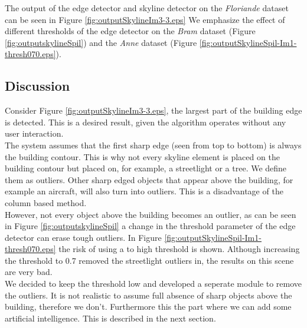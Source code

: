 The output of the edge detector and skyline detector on the \emph{Floriande}
dataset \cite{Fit3d} can be seen in Figure \ref{fig:outputSkylineIm3-3.eps}
We emphasize the effect of different thresholds of the edge detector on the
\emph{Bram} dataset (Figure \ref{fig:outputskylineSpil}) and the \emph{Anne}
dataset (Figure \ref{fig:outputSkylineSpil-Im1-thresh070.eps}).


\clearpage
{}
\clearpage

\clearpage

\subsection{Discussion}  %
Consider Figure \ref{fig:outputSkylineIm3-3.eps}, the largest part of the
building edge is detected. This is a desired result, given the algorithm
operates without any user interaction.\\
The system assumes that the first sharp edge (seen from top to bottom) is always
the building contour. This is why not every skyline element is placed on the building
contour but placed on, for example, a streetlight or a tree. We define them
as outliers. Other sharp edged objects that appear above the building,
for example an aircraft, will also turn into outliers.  This is a disadvantage of the
	column based method.\\
However, not every object above the building becomes an outlier, as can be seen in Figure
\ref{fig:outputskylineSpil} a change in the threshold parameter of the edge
detector can erase tough outliers. 
In Figure \ref{fig:outputSkylineSpil-Im1-thresh070.eps} the risk of using a to high
threshold is shown. Although increasing the threshold to 0.7 removed the
streetlight outliers in, the results on this scene are very bad.\\

We decided to keep the threshold low and developed a seperate module to remove the outliers. It is not realistic to
assume full absence of sharp objects above the building, therefore we don't.
Furthermore this the part where we can add some artificial intelligence. This is
described in the next section.  

